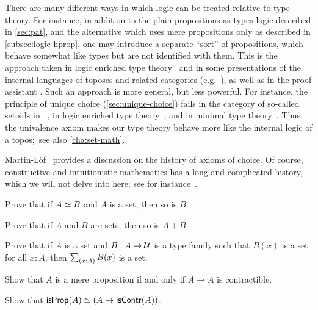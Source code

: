 There are many different ways in which logic can be treated relative to type theory.
For instance, in addition to the plain propositions-as-types logic described in \autoref{sec:pat}, and the alternative which uses mere propositions only as described in \autoref{subsec:logic-hprop}, one may introduce a separate ``sort'' of propositions, which behave somewhat like types but are not identified with them.
This is the approach taken in logic enriched type theory~\cite{aczel2002collection} and in some presentations of the internal languages of toposes and related categories (e.g.~\cite{jacobs1999categorical,elephant}), as well as in the proof assistant \Coq.
Such an approach is more general, but less powerful.
For instance, the principle of unique choice (\autoref{sec:unique-choice}) fails in the category of so-called setoids in \Coq~\cite{Spiwack}, in logic enriched type theory~\cite{aczel2002collection}, and in minimal type theory~\cite{maietti2005toward}.
Thus, the univalence axiom makes our type theory behave more like the internal logic of a topos;~see also \autoref{cha:set-math}.

Martin-L\"of~\cite{martin2006100} provides a discussion on the history of axioms of choice.
Of course, constructive and intuitionistic mathematics has a long and complicated history, which we will not delve into here; see for instance~\cite{TroelstraI,TroelstraII}.

\sectionExercises

\begin{ex}
  Prove that if $A \simeq B$ and $A$ is a set, then so is $B$.
\end{ex}

\begin{ex}\label{ex:isset-coprod}
  Prove that if $A$ and $B$ are sets, then so is $A+B$.
\end{ex}

\begin{ex}\label{ex:isset-sigma}
  Prove that if $A$ is a set and $B:A\to \mathcal{U}$ is a type family such that $B(x)$ is a set for all $x:A$, then $\sm{x:A} B(x)$ is a set.
\end{ex}

\begin{ex}\label{ex:prop-endocontr}
  Show that $A$ is a mere proposition if and only if $A\to A$ is contractible.
\end{ex}

\begin{ex}\label{ex:prop-inhabcontr}
  Show that $\mathsf{isProp}(A) \simeq (A\to\mathsf{isContr}(A))$.
\end{ex}

